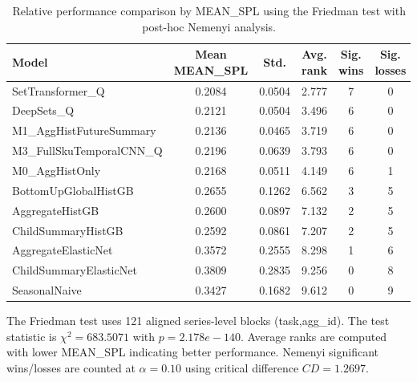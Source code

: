 \begin{table}[H]
\centering
\caption{Relative performance comparison by MEAN_SPL using the Friedman test with post-hoc Nemenyi analysis.}
\label{tab:stats_mean_spl}
\begin{threeparttable}
\begin{tabular}{lccccc}
\toprule
Model & Mean MEAN_SPL & Std. & Avg. rank & Sig. wins & Sig. losses \\
\midrule
SetTransformer\_Q & 0.2084 & 0.0504 & 2.777 & 7 & 0 \\
DeepSets\_Q & 0.2121 & 0.0504 & 3.496 & 6 & 0 \\
M1\_AggHistFutureSummary & 0.2136 & 0.0465 & 3.719 & 6 & 0 \\
M3\_FullSkuTemporalCNN\_Q & 0.2196 & 0.0639 & 3.793 & 6 & 0 \\
M0\_AggHistOnly & 0.2168 & 0.0511 & 4.149 & 6 & 1 \\
BottomUpGlobalHistGB & 0.2655 & 0.1262 & 6.562 & 3 & 5 \\
AggregateHistGB & 0.2600 & 0.0897 & 7.132 & 2 & 5 \\
ChildSummaryHistGB & 0.2592 & 0.0861 & 7.207 & 2 & 5 \\
AggregateElasticNet & 0.3572 & 0.2555 & 8.298 & 1 & 6 \\
ChildSummaryElasticNet & 0.3809 & 0.2835 & 9.256 & 0 & 8 \\
SeasonalNaive & 0.3427 & 0.1682 & 9.612 & 0 & 9 \\
\bottomrule
\end{tabular}
\begin{tablenotes}
\footnotesize \item The Friedman test uses 121 aligned series-level blocks (task,agg\_id). The test statistic is $\chi^2=683.5071$ with $p=2.178e-140$. Average ranks are computed with lower MEAN_SPL indicating better performance. Nemenyi significant wins/losses are counted at $\alpha=0.10$ using critical difference $CD=1.2697$.
\end{tablenotes}
\end{threeparttable}
\end{table}
